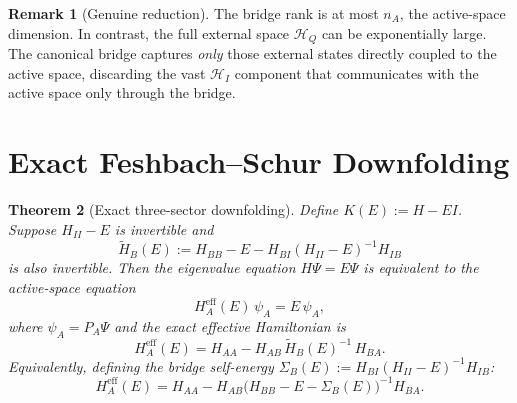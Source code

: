 \documentclass[12pt]{article}
\theoremstyle{plain}
\newtheorem{theorem}{Theorem}[section]
\theoremstyle{definition}
\newtheorem{remark}[theorem]{Remark}
\numberwithin{equation}{section}
\newcommand{\eff}{\mathrm{eff}}
\begin{document}
\begin{remark}[Genuine reduction]
The bridge rank is at most $n_A$, the active-space dimension.
In contrast, the full external space $\mathcal{H}_Q$ can be
exponentially large.  The canonical bridge captures \emph{only}
those external states directly coupled to the active space,
discarding the vast $\mathcal{H}_I$ component that communicates
with the active space only through the bridge.
\end{remark}


\section{Exact Feshbach--Schur Downfolding}\label{sec:feshbach}

\begin{theorem}[Exact three-sector downfolding]\label{thm:downfolding}
Define $K(E):=H-EI$.  Suppose $H_{II}-E$ is invertible and
\begin{equation}\label{eq:Htilde}
\widetilde{H}_B(E) := H_{BB}-E-H_{BI}(H_{II}-E)^{-1}H_{IB}
\end{equation}
is also invertible.  Then the eigenvalue equation $H\Psi=E\Psi$
is equivalent to the active-space equation
\begin{equation}\label{eq:activeEV}
H_A^{\eff}(E)\,\psi_A = E\,\psi_A,
\end{equation}
where $\psi_A=P_A\Psi$ and the exact effective Hamiltonian is
\begin{equation}\label{eq:Heff}
\boxed{H_A^{\eff}(E) = H_{AA}
- H_{AB}\,\widetilde{H}_B(E)^{-1}\,H_{BA}.}
\end{equation}
Equivalently, defining the bridge self-energy
$\Sigma_B(E):=H_{BI}(H_{II}-E)^{-1}H_{IB}$:
\begin{equation}\label{eq:Heff2}
\boxed{H_A^{\eff}(E) = H_{AA}
- H_{AB}\bigl(H_{BB}-E-\Sigma_B(E)\bigr)^{-1}H_{BA}.}
\end{equation}
\end{theorem}
\end{document}
